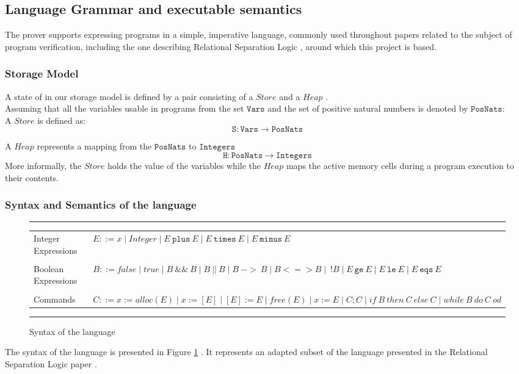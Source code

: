 \documentclass[12pt,a4paper]{article}
\begin{document}
\subsection{Language Grammar and executable semantics}
The prover supports expressing programs in a simple, imperative language, commonly used throughout papers \cite{SeparationLogic} \cite{primer} related to the subject of program verification, including the one describing Relational Separation Logic \cite{relational}, around  which this project is based. 
\subsubsection{Storage Model}
A state of in our storage model is defined by a pair consisting of a \(Store\) and a \(Heap\) .
\\
Assuming that all the variables usable in programs from the set \(\mathtt{Vars}\) and the set of positive natural numbers is denoted by \(\mathtt{PosNats}\): \\

A \(Store\) is defined as:
\[ \mathtt{S} : \mathtt{Vars} \rightarrow \mathtt{PosNats} \]

A \(Heap\) represents a mapping from the \(\mathtt{PosNats}\) to \(\mathtt{Integers}\)
\[ \mathtt{H} : \mathtt{PosNats} \rightarrow \mathtt{Integers} \] 
More informally, the \(Store\) holds the value of the variables while the \(Heap\) maps the active memory cells during a program execution to their contents.
\subsubsection{Syntax and Semantics of the language}
\begin{figure}[h]
	\noindent\rule{\linewidth}{0.4pt}
	\begin{tabularx}{\linewidth}{l  X}
		Integer Expressions& \(E ::= x \mid Integer \mid E\ \mathtt{plus}\ E \mid E\ \mathtt{times}\ E \mid E\ \mathtt{minus}\ E \) \\
		\\
		Boolean Expressions& \(B ::= false \mid true \mid B\ \mathtt{\&\&}\ B \mid  B\ ||\ B \mid B\  \mathtt{->}\ B \mid B \mathtt{<=>} B \mid \ ! B \mid E\ \mathtt{ge}\ E \mid E\ \mathtt{le}\ E \mid E\ \mathtt{eqs}\ E \)\\
		\\ 	
		Commands& \(C ::= x := alloc(E) \mid x := [E] \mid [E] := E \mid free(E) \mid x := E \mid C;C \mid if\ B\ then\ C\ else\ C \mid while\ B\ do\ C\ od \) \\
	\end{tabularx}
	\caption{Syntax of the language}
	\label{fig:langSyntax}
	\noindent\rule{\linewidth}{0.4pt}
\end{figure}
The syntax of the language is presented in Figure \ref{fig:langSyntax} . It represents an adapted subset of the language presented in the Relational Separation Logic paper \cite{relational} . 
\end{document}
